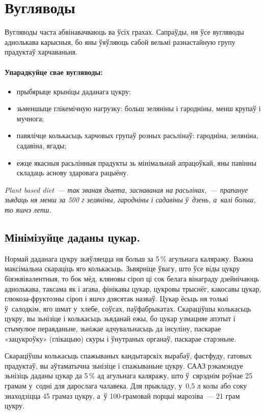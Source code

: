 \section{Вугляводы}

Вугляводы часта абвінавачваюць ва ўсіх грахах. Сапраўды, ня ўсе вугляводы аднолькава карысныя, бо яны ўяўляюць сабой вельмі разнастайную групу прадуктаў харчаваньня.

\paragraph{Упарадкуйце свае вугляводы:}
\begin{itemize}
  \item прыбярыце крыніцы даданага цукру;
  \item зьменшыце глікемічную нагрузку: больш зеляніны і гародніны, менш крупаў і мучнога;
  \item павялічце колькасьць харчовых групаў розных расьлінаў: гародніна, зеляніна, садавіна, ягады;
  \item ежце якасныя расьлінныя прадукты зь мінімальнай апрацоўкай, яны павінны складаць аснову здаровага рацыёну.
\end{itemize}

\emph{Plant based diet~--- так званая дыета, заснаваная на расьлінах,~--- прапануе зьядаць ня менш за 500 г зеляніны, гародніны і садавіны ў~дзень, а~калі больш, то яшчэ лепш.}

\subsection*{Мінімізуйце даданы цукар.} 
Нормай даданага цукру зьяўляецца ня больш за 5\,\% агульнага каляражу. Важна максімальна скараціць яго колькасьць. Зьвярніце ўвагу, што ўсе віды цукру біяэквівалентныя, то бок мёд, кляновы сіроп ці сок белага вінаграду дзейнічаюць аднолькава, таксама як і агава, фінікавы цукар, цукровы трыснёг, какосавы цукар, глюкоза-фруктозны сіроп і яшчэ дзясятак назваў. Цукар ёсьць ня толькі ў~салодкім, яго шмат у~хлебе, соўсах, паўфабрыкатах. Скараціўшы колькасьць цукру, вы зьнізіце і колькасьць зьяданай ежы, бо цукар узмацняе апэтыт і стымулюе пераяданьне, зьніжае адчувальнасьць да інсуліну, паскарае «зацукроўку» (глікацыю) скуры і ўнутраных органаў, паскарае старэньне.

Скараціўшы колькасьць спажываных кандытарскіх вырабаў, фастфуду, гатовых прадуктаў, вы аўтаматычна зьнізіце і спажываньне цукру. СААЗ рэкамэндуе зьнізіць даданы цукар да 5\,\% ад агульнага каляражу, што ў~сярэднім роўнае 25 грамам у~содні для дарослага чалавека. Для прыкладу, у~0,5 л колы або соку знаходзіцца 45 грамаз цукру, а~ў 100-грамовай порцыі марозіва~--- 21 грам цукру.

